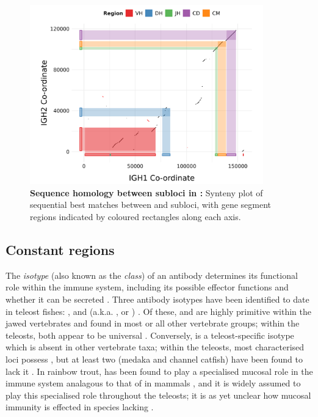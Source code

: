 \begin{figure}
	\centering
	\includegraphics[width=0.9\textwidth]{_Figures/png/nfu-locus-dots}
	\caption[Sequence homology between subloci in \Nfu \igh{}]{\textbf{Sequence homology between subloci in \Nfu \igh{}:} Synteny plot of sequential best matches between  and  subloci, with gene segment regions indicated by coloured rectangles along each axis.}
	\label{fig:nfu-locus-synteny}
\end{figure}
	
	\subsection{Constant regions}
	\label{sec:nfu-locus-constant}


	
	The \textit{isotype} (also known as the \textit{class}) of an antibody determines its functional role within the immune system, including its possible effector functions and whether it can be secreted \parencite{schroeder2010immunoglobulins}. Three antibody isotypes have been identified to date in teleost fishes: ,  and  (a.k.a. ,  or ) \parencite{fillatreau2013astonishing,bengten2015fishantibodies,magadan2015fishrepertoires}. Of these,  and  are highly primitive within the jawed vertebrates and found in most or all other vertebrate groups; within the teleosts, both appear to be universal \parencite{bengten2015fishantibodies}. Conversely,  is a teleost-specific isotype which is absent in other vertebrate taxa; within the teleosts, most characterised \igh{} loci possess , but at least two (medaka and channel catfish) have been found to lack it \parencite{fillatreau2013astonishing,bengten2015fishantibodies}. In rainbow trout,  has been found to play a specialised mucosal role in the immune system analagous to that of  in mammals \parencite{zhang2010igtgut,xu2013igtskin}, and it is widely assumed to play this specialised role throughout the teleosts; it is as yet unclear how mucosal immunity is effected in species lacking .
	
